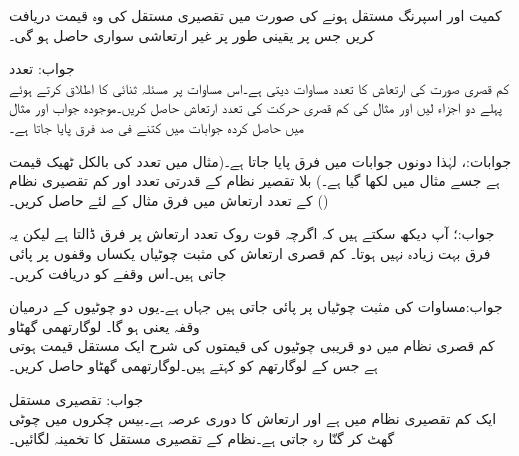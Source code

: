 کمیت  اور اسپرنگ مستقل  ہونے کی صورت میں تقصیری مستقل کی وہ قیمت دریافت کریں جس پر یقینی طور پر غیر ارتعاشی سواری حاصل ہو گی۔

  جواب:
\quad تعدد\\
کم قصری صورت کی ارتعاش کا تعدد   مساوات  دیتی ہے۔اس مساوات پر مسئلہ ثنائی کا اطلاق کرتے ہوئے پہلے دو اجزاء لیں اور  مثال  کی کم قصری حرکت  کی تعدد ارتعاش حاصل کریں۔موجودہ جواب اور مثال میں حاصل کردہ جوابات میں کتنے فی صد فرق پایا جاتا ہے۔

جوابات:،  لہٰذا دونوں جوابات میں  فرق پایا جاتا ہے۔(مثال  میں تعدد کی بالکل ٹھیک قیمت  ہے جسے مثال میں  لکھا گیا ہے۔)
بلا تقصیر نظام کے قدرتی تعدد اور کم تقصیری نظام () کے تعدد ارتعاش میں فرق مثال  کے لئے حاصل کریں۔

جواب:؛ آپ دیکھ سکتے ہیں کہ اگرچہ قوت روک تعدد ارتعاش پر فرق ڈالتا ہے لیکن یہ فرق بہت زیادہ نہیں ہوتا۔
کم قصری ارتعاش کی مثبت چوٹیاں یکساں وقفوں پر پائی جاتی ہیں۔اس وقفے کو دریافت کریں۔ 

جواب:مساوات  کی مثبت چوٹیاں  پر پائی جاتی ہیں جہاں  ہے۔یوں دو چوٹیوں کے درمیان وقفہ  یعنی  ہو گا۔
\quad لوگارتھمی گھٹاو\\
کم قصری نظام میں  دو قریبی چوٹیوں کی قیمتوں کی شرح ایک مستقل قیمت ہوتی ہے جس کے لوگارتھم کو  کہتے ہیں۔لوگارتھمی گھٹاو  حاصل کریں۔ 

جواب:
\quad تقصیری مستقل\\
ایک کم تقصیری نظام میں  ہے اور ارتعاش کا دوری عرصہ  ہے۔بیس چکروں میں چوٹی گھٹ کر  گنّا رہ جاتی ہے۔نظام کے تقصیری مستقل کا تخمینہ لگائیں۔

